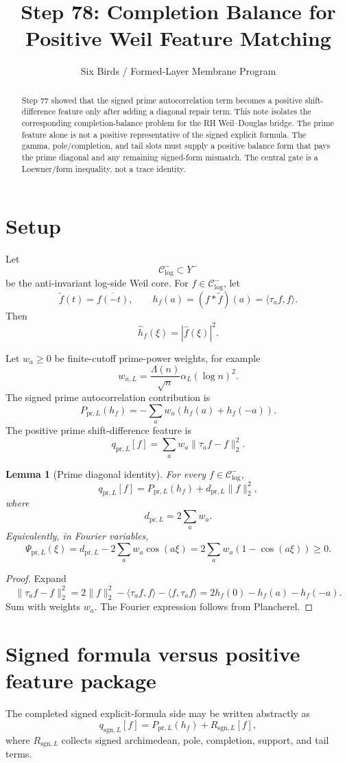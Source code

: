 \documentclass[11pt]{article}
\title{Step 78: Completion Balance for Positive Weil Feature Matching}
\author{Six Birds / Formed-Layer Membrane Program}
\date{}
\newtheorem{lemma}[theorem]{Lemma}
\newcommand{\pr}{\mathrm{pr}}
\newcommand{\sgn}{\mathrm{sgn}}
\begin{document}
\maketitle

\begin{abstract}
Step 77 showed that the signed prime autocorrelation term becomes a positive shift-difference feature only after adding a diagonal repair term.  This note isolates the corresponding completion-balance problem for the RH Weil--Douglas bridge.  The prime feature alone is not a positive representative of the signed explicit formula.  The gamma, pole/completion, and tail slots must supply a positive balance form that pays the prime diagonal and any remaining signed-form mismatch.  The central gate is a Loewner/form inequality, not a trace identity.
\end{abstract}

\section{Setup}
Let
\[
    \mathcal C^-_{\log}\subset Y^-
\]
be the anti-invariant log-side Weil core.  For \(f\in \mathcal C^-_{\log}\), let
\[
    \widetilde f(t)=\overline{f(-t)},
    \qquad h_f(a)=(f*\widetilde f)(a)=\langle \tau_a f,f\rangle .
\]
Then
\[
    \widehat h_f(\xi)=|\widehat f(\xi)|^2 .
\]

Let \(w_a\ge0\) be finite-cutoff prime-power weights, for example
\[
    w_{n,L}=\frac{\Lambda(n)}{\sqrt n}\alpha_L(\log n)^2.
\]
The signed prime autocorrelation contribution is
\[
    P_{\pr,L}(h_f)=-\sum_a w_a(h_f(a)+h_f(-a)).
\]
The positive prime shift-difference feature is
\[
    q_{\pr,L}[f]=\sum_a w_a\|\tau_a f-f\|_2^2.
\]

\begin{lemma}[Prime diagonal identity]
For every \(f\in\mathcal C^-_{\log}\),
\[
    q_{\pr,L}[f]
    = P_{\pr,L}(h_f)+d_{\pr,L}\|f\|_2^2,
\]
where
\[
    d_{\pr,L}=2\sum_a w_a.
\]
Equivalently, in Fourier variables,
\[
    \Psi_{\pr,L}(\xi)=d_{\pr,L}-2\sum_a w_a\cos(a\xi)
    =2\sum_a w_a(1-\cos(a\xi))\ge0.
\]
\end{lemma}

\begin{proof}
Expand
\[
\|\tau_a f-f\|_2^2=2\|f\|_2^2-\langle \tau_a f,f\rangle-\langle f,\tau_a f\rangle
=2h_f(0)-h_f(a)-h_f(-a).
\]
Sum with weights \(w_a\).  The Fourier expression follows from Plancherel.
\end{proof}

\section{Signed formula versus positive feature package}
The completed signed explicit-formula side may be written abstractly as
\[
    q_{\sgn,L}[f]
    =P_{\pr,L}(h_f)+R_{\sgn,L}[f],
\]
where \(R_{\sgn,L}\) collects signed archimedean, pole, completion, support, and tail terms.
\end{document}
